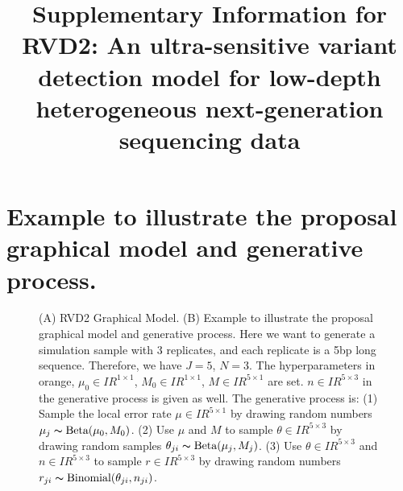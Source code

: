 \documentclass[11pt,reqno]{amsart}
\title[RVD2: Supplementary Information]{Supplementary Information for
  RVD2: An ultra-sensitive variant detection model for low-depth heterogeneous next-generation sequencing data}
\newcommand{\RR}{I\!\!R} %
\begin{document}
\maketitle

\section{Example to illustrate the proposal graphical model and generative process.}\label{sec:appendix_example}

\begin{figure}[!bpth]
    \centering
    \quad
    \quad
    \caption{(A) RVD2 Graphical Model. (B) Example to illustrate the proposal graphical model and generative process. Here we want to generate a simulation sample with 3 replicates, and each replicate is a 5bp long sequence. Therefore, we have $ J = 5 $, $N = 3$. The hyperparameters in orange, $\mu_0 \in \RR^{1 \times 1}$, $M_0 \in \RR^{1 \times 1}$, $M \in \RR^{5 \times 1}$ are set. $n \in \RR^{5 \times 3}$ in the generative process is given as well. The generative process is: (1) Sample the local error rate $\mu \in \RR^{5 \times 1}$ by drawing random numbers $\mu_j \thicksim \text{Beta}(\mu_0, M_0)$. (2) Use $\mu $ and $ M $ to sample $\theta \in \RR^{5 \times 3}$ by drawing random samples $\theta_{ji} \thicksim \text{Beta}(\mu_j, M_j)$. (3) Use $\theta \in \RR^{5 \times 3}$ and $n \in \RR^{5 \times 3}$ to sample $r \in \RR^{5 \times 3}$ by drawing random numbers $r_{ji} \thicksim \text{Binomial}(\theta_{ji}, n_{ji})$.} 
    \label{fig:example}
\end{figure}
\end{document}
